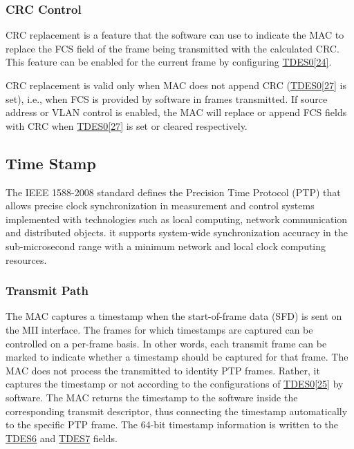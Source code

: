 \documentclass[main\_\_EN.tex]{subfiles}
\begin{document}
\subsubsection{CRC Control}

CRC replacement is a feature that the software can use to indicate the MAC to replace the FCS field of the frame being transmitted with the calculated CRC. This feature can be enabled for the current frame by configuring \hyperref[tab:ethernetmac-TDES0]{TDES0[24]}.

CRC replacement is valid only when MAC does not append CRC (\hyperref[tab:ethernetmac-TDES0]{TDES0[27]} is set), i.e., when FCS is provided by software in frames transmitted. If source address or VLAN control is enabled, the MAC will replace or append FCS fields with CRC when \hyperref[tab:ethernetmac-TDES0]{TDES0[27]} is set or cleared respectively.

\subsection{Time Stamp}

The IEEE 1588-2008 standard defines the Precision Time Protocol (PTP) that allows precise clock
synchronization in measurement and control systems
implemented with technologies such as local computing, network communication and distributed objects. it supports system-wide synchronization accuracy in the sub-microsecond range with a minimum network and local clock computing resources.

\subsubsection{Transmit Path}

The MAC captures a timestamp when the start-of-frame data (SFD) is sent on the MII interface. The frames for which timestamps are captured can be controlled on a per-frame basis. In other words, each transmit frame can be marked to indicate whether a timestamp should be captured for that frame. The MAC does not process the transmitted to identity PTP frames. Rather, it captures the timestamp or not according to the configurations of \hyperref[tab:ethernetmac-TDES0]{TDES0[25]} by software. The MAC returns the timestamp to the software inside the corresponding transmit descriptor, thus connecting the timestamp automatically to the specific PTP frame. The 64-bit timestamp information is written to the \hyperref[tab:ethernetmac-TDES6]{TDES6} and \hyperref[tab:ethernetmac-TDES7]{TDES7} fields.
\end{document}
